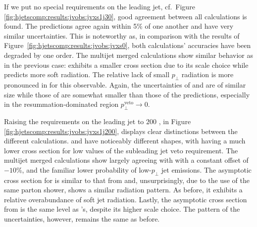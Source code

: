 If we put no special requirements on the leading jet, cf.\ Figure 
\ref{fig:hjetscomp:results:jvobs:jvxs1j30}, good agreement 
between all calculations is found. The \NNLOPS predictions agree again within 
5\% of one another and have very similar uncertainties. This is noteworthy 
as, in comparison with the results of 
Figure~\ref{fig:hjetscomp:results:jvobs:jvxs0}, both calculations' 
accuracies have been degraded by one order. The multijet merged calculations 
show similar behavior as in the previous case: \MGaMC exhibits a smaller cross section due to 
its scale choice while \Sherpa \MEPSatNLO predicts more soft radiation. 
The relative lack of small $p_\perp$ radiation is more 
pronounced in \Herwig for this observable. Again, the uncertainties of \MGaMC and \Sherpa 
are of similar size while those of \Herwig are somewhat smaller than those of the \NNLOPS 
predictions, especially in the resummation-dominated region 
$p_\perp^\text{veto}\to 0$.

Raising the requirements on the leading jet to $200$ \gev, in Figure 
\ref{fig:hjetscomp:results:jvobs:jvxs1j200}, displays clear distinctions 
between the different calculations.  
\Sherpa \NNLOPS and \Powheg \NNLOPS have noticeably different shapes, with \Sherpa having a 
much lower cross section for low values of the subleading jet veto requirement. 
The multijet merged calculations show \Herwig largely agreeing with 
\Powheg with a constant offset of $-10\%$, and the familiar lower 
probability of low-$p_\perp$ jet emissions. 
The asymptotic cross section for \Sherpa \MEPSatNLO is similar to that from \Sherpa \NNLOPS and, 
unsurprisingly, due to the use of the same parton shower, shows a 
similar radiation pattern. As before, it exhibits 
a relative overabundance of soft jet radiation. Lastly, the asymptotic cross section from \MGaMC 
is the same level as \Powheg's, despite 
its higher scale choice. The pattern of the uncertainties, however, 
remains the same as before.

